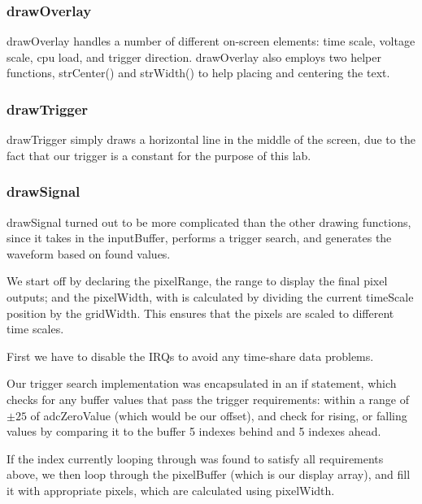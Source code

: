 \documentclass[12pt,oneside,letterpaper]{article}
\begin{document}
\subsubsection{drawOverlay}
drawOverlay handles a number of different on-screen elements: time scale, voltage scale, cpu load, and trigger direction. drawOverlay also employs two helper functions, strCenter() and strWidth() to help placing and centering the text.




\subsubsection{drawTrigger}
drawTrigger simply draws a horizontal line in the middle of the screen, due to the fact that our trigger is a constant for the purpose of this lab.

\subsubsection{drawSignal}
drawSignal turned out to be more complicated than the other drawing functions, since it takes in the inputBuffer, performs a trigger search, and generates the waveform based on found values.

We start off by declaring the pixelRange, the range to display the final pixel outputs; and the pixelWidth, with is calculated by dividing the current timeScale position by the gridWidth. This ensures that the pixels are scaled to different time scales.

First we have to disable the IRQs to avoid any time-share data problems.


Our trigger search implementation was encapsulated in an if statement, which checks for any buffer values that pass the trigger requirements: within a range of $\pm 25$ of adcZeroValue (which would be our offset), and check for rising, or falling values by comparing it to the buffer 5 indexes behind and 5 indexes ahead.



If the index currently looping through was found to satisfy all requirements above, we then loop through the pixelBuffer (which is our display array), and fill it with appropriate pixels, which are calculated using pixelWidth.
\end{document}
